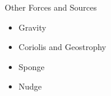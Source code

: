\author{Thijs Heus}
\begin{frame}{Other Forces and Sources}
\begin{itemize}
 \item Gravity
 \item Coriolis and Geostrophy
 \item Sponge
 \item Nudge
\end{itemize}
\end{frame}
